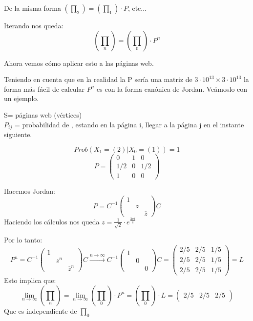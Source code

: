 De la misma forma $(\prod_2) = (\prod_1) \cdot P$, etc...

Iterando nos queda:
$$\left(\prod_n\right) = \left(\prod_0\right) \cdot P^n$$

Ahora vemos cómo aplicar esto a las páginas web.


Teniendo en cuenta que en la realidad la P sería una matriz de $3\cdot 10^{13} \times 3\cdot 10^{13}$ la forma más fácil de calcular $P^n$ es con la forma canónica de Jordan. Veámoslo con un ejemplo.
\begin{example}[1]{}



	\begin{center}
	\centering
\end{center}


	S= páginas web (vértices)\\
	$P_{ij}$ = probabilidad de , estando en la página i, llegar a la página j en el instante siguiente.

	$$Prob(X_1 = (2)| X_0 = (1)) = 1$$
	$$P =\left(\begin{matrix}
	0 & 1 & 0\\
	1/2 & 0 & 1/2\\
	1 & 0 & 0
	\end{matrix}\right)$$

	Hacemos Jordan:
	$$P = C^{-1} \left(\begin{matrix}
	1&&\\
	&z&\\
	&&\overline{z}
	\end{matrix}\right) C$$
	Haciendo los cálculos nos queda $z = \frac{1}{\sqrt{2}}\cdot e^{\frac{3\pi i}{4}}$

	Por lo tanto:
	$$P^n =  C^{-1} \left(\begin{matrix}
	1&&\\
	&z^n&\\
	&&\overline{z}^n
	\end{matrix}\right) C \stackrel{n\rightarrow \infty}{\rightarrow}  C^{-1} \left(\begin{matrix}
	1&&\\
	&0&\\
	&&0
	\end{matrix}\right) C = \left(\begin{matrix}
	2/5&2/5&1/5\\
	2/5&2/5&1/5\\
	2/5&2/5&1/5
	\end{matrix}\right) = L$$
	Esto implica que:
	$$\lim_{n\rightarrow\infty}\left(\prod_n\right) = \lim_{n\rightarrow\infty}\left(\prod_0\right)\cdot P^n = \left(\prod_0\right)\cdot L =( \begin{matrix}
	2/5&2/5&2/5
	\end{matrix})$$
	Que es independiente de $\prod_0$
\end{example}


